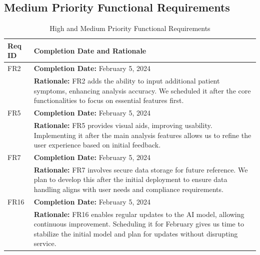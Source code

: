 \documentclass[12pt]{article}
\begin{document}
  \subsection{Medium Priority Functional Requirements}
\begin{table}[H]
  \label{TblMediumPriorityFRs}
  \begin{tabular}{p{}|p{}}
  \toprule
  \textbf{Req ID} & \textbf{Completion Date and Rationale} \\
  \midrule
  FR2 & \textbf{Completion Date:} February 5, 2024\\
      & \textbf{Rationale:} FR2 adds the ability to input additional patient symptoms, enhancing analysis accuracy. We scheduled it after the core functionalities to focus on essential features first. \\
  \midrule
  FR5 & \textbf{Completion Date:} February 5, 2024\\
      & \textbf{Rationale:} FR5 provides visual aids, improving usability. Implementing it after the main analysis features allows us to refine the user experience based on initial feedback. \\
  \midrule
  FR7 & \textbf{Completion Date:} February 5, 2024\\
      & \textbf{Rationale:} FR7 involves secure data storage for future reference. We plan to develop this after the initial deployment to ensure data handling aligns with user needs and compliance requirements. \\
  \midrule
  FR16 & \textbf{Completion Date:} February 5, 2024\\
       & \textbf{Rationale:} FR16 enables regular updates to the AI model, allowing continuous improvement. Scheduling it for February gives us time to stabilize the initial model and plan for updates without disrupting service. \\
  \bottomrule
  \end{tabular}
  \caption{High and Medium Priority Functional Requirements}
  \end{table}
\end{document}
